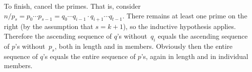 \documentclass{test}  %
\begin{document}
\begin{problem}
\begin{exes}
\begin{answer}
  To finish, cancel the primes.
  That is, consider 
  $n/p_s=p_0\cdots p_{s-1}=q_0\cdots q_{i-1}\cdot q_{i+1}\cdots q_{t-1}$.
  There remains at least one prime on the right (by the assumption that 
  $s=k+1$), so the inductive hypothesis applies. 
  Therefore
  the ascending sequence of $q$'s without~$q_i$ 
  equals the ascending sequence of $p$'s without~$p_s$,
  both in length and in members. 
  Obviously then the entire sequence of $q$'s equals the entire sequence of
  $p$'s, again in length and in individual members.   
\end{answer}
\end{exes}




\end{problem}
\end{document}
